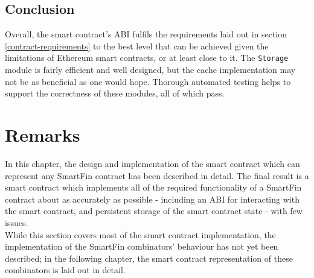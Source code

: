 \subsection{Conclusion}

Overall, the smart contract's ABI fulfils the requirements laid out in section \ref{contract-requirements} to the best level that can be achieved given the limitations of Ethereum smart contracts, or at least close to it. The \texttt{Storage} module is fairly efficient and well designed, but the cache implementation may not be as beneficial as one would hope. Thorough automated testing helps to support the correctness of these modules, all of which pass.


\section{Remarks}

In this chapter, the design and implementation of the smart contract which can represent any SmartFin contract has been described in detail. The final result is a smart contract which implements all of the required functionality of a SmartFin contract about as accurately as possible - including an ABI for interacting with the smart contract, and persistent storage of the smart contract state - with few issues. \\

While this section covers most of the smart contract implementation, the implementation of the SmartFin combinators' behaviour has not yet been described; in the following chapter, the smart contract representation of these combinators is laid out in detail.

